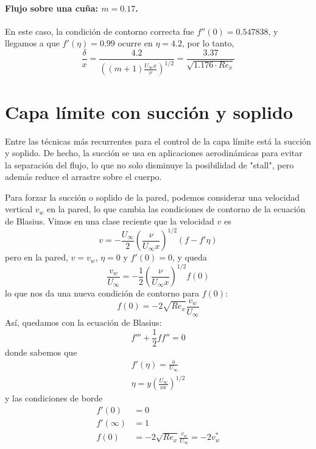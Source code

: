 \paragraph*{Flujo sobre una cuña: $m=0.17$.}
En este caso, la condición de contorno correcta fue $f''(0)=0.547838$, y llegamos a que $f'(\eta)=0.99$ ocurre en $\eta=4.2$, por lo tanto, 
%
\begin{equation}
\frac{\delta}{x}=\frac{4.2}{\left((m+1)\frac{U_\infty x}{\nu}\right)^{1/2}} = \frac{3.37}{\sqrt{1.176\cdot Re_x}} 
\end{equation}

\section*{Capa límite con succión y soplido}
Entre las técnicas más recurrentes para el control de la capa límite está la succión y soplido. De hecho, la succión se usa en aplicaciones aerodinámicas para evitar la separación del flujo, lo que no solo disminuye la posibilidad de "stall", pero además reduce el arrastre sobre el cuerpo.

Para forzar la succión o soplido de la pared, podemos considerar una velocidad vertical $v_w$ en la pared, lo que cambia las condiciones de contorno de la ecuación de Blasius. Vimos en una clase reciente que la velocidad $v$ es
%
\begin{equation}
v = -\frac{U_\infty}{2}\left(\frac{\nu}{U_\infty x}\right)^{1/2}(f-f'\eta)
\end{equation}
%
pero en la pared, $v=v_w$, $\eta=0$ y $f'(0)=0$, y queda
%
\begin{equation}
\frac{v_w}{U_\infty} = -\frac{1}{2}\left(\frac{\nu}{U_\infty x}\right)^{1/2}f(0)
\end{equation}
%
lo que nos da una nueva condición de contorno para $f(0)$:
%
\begin{equation}
f(0) = -2\sqrt{Re_x}\frac{v_w}{U_\infty}
\end{equation}
%
Así, quedamos con la ecuación de Blasius:
%
\begin{equation}
f'''+\frac{1}{2}ff''=0
\end{equation}
%
donde sabemos que
%
\begin{align}
f'(\eta) = \frac{u}{U_\infty}\\
\eta = y\left(\frac{U_\infty}{\nu x}\right)^{1/2}
\end{align}
%
y las condiciones de borde
%
\begin{align}
f'(0) &= 0\\
f'(\infty) &= 1\\
f(0) &= -2\sqrt{Re_x}\frac{v_w}{U_\infty}=-2v_w^*
\end{align}

